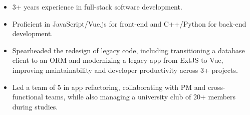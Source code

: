 \begin{cvparagraph}
\vspace{0.3em}
\begin{itemize}
    \item 3+ years experience in full-stack software development.
    \item Proficient in JavaScript/Vue.js for front-end and C++/Python for back-end development.
    \item Spearheaded the redesign of legacy code, including transitioning a database client to an ORM and modernizing a legacy app from ExtJS to Vue, improving maintainability and developer productivity across 3+ projects.
    \item Led a team of 5 in app refactoring, collaborating with PM and cross-functional teams, while also managing a university club of 20+ members during studies.
\end{itemize}
\end{cvparagraph}

